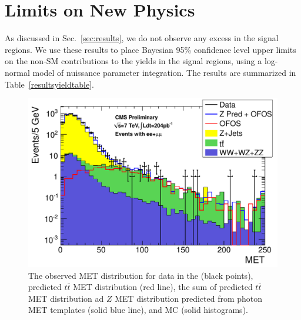 \section{Limits on New Physics}
\label{sec:limit}

As discussed in Sec.~\ref{sec:results}, we do not observe any excess in the signal regions.
We use these results to place Bayesian 95\% confidence level upper limits~\cite{ref:cl95cms} on 
the non-SM contributions to the yields in the signal regions, using a log-normal model
of nuissance parameter integration. The results are summarized in Table~\ref{resultsyieldtable}.  


\begin{figure}[hbt]
\begin{center}
\includegraphics[width=0.78\linewidth]{plots/lep_metPredicted.pdf}
\caption{\label{fig:results}\protect 
  The observed MET distribution for data in the (black points),
  predicted $t\bar{t}$ MET distribution (red line), the sum of predicted %
  $t\bar{t}$ MET distribution ad
  $Z$  MET  distribution  predicted  from photon  MET  templates
  (solid blue line),  and MC (solid histograms). 
  }
\end{center}
\end{figure}

